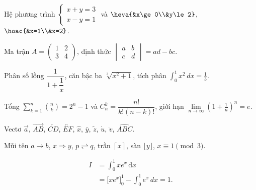 \documentclass[12pt]{article}
\begin{document}
Hệ phương trình $\begin{cases} x+y=3 \\ x-y=1 \end{cases}$ và $\heva{&x\ge 0\\&y\le 2}$, $\hoac{&x=1\\&x=2}$.

Ma trận $A=\begin{pmatrix} 1 & 2 \\ 3 & 4 \end{pmatrix}$, định thức $\begin{vmatrix} a & b \\ c & d \end{vmatrix}=ad-bc$.

Phân số lồng $\dfrac{1}{1+\dfrac{1}{x}}$, căn bậc ba $\sqrt[3]{x^2+1}$, tích phân $\displaystyle\int_0^1 x^2\,dx=\frac{1}{3}$.

Tổng $\sum\limits_{k=1}^{n} \binom{n}{k} = 2^n - 1$ và $C_n^k = \dfrac{n!}{k!(n-k)!}$, giới hạn $\lim\limits_{n\to\infty}\left(1+\frac{1}{n}\right)^n = e$.

Vectơ $\vec{a}$, $\overrightarrow{AB}$, $\overleftarrow{CD}$, $\overleftrightarrow{EF}$, $\hat{x}$, $\bar{y}$, $\tilde{z}$, $\dot{u}$, $\ddot{v}$, $\widehat{ABC}$.

Mũi tên $a \rightarrow b$, $x \Rightarrow y$, $p \rightleftharpoons q$, trần $\left\lceil x \right\rceil$, sàn $\lfloor y \rfloor$, $x \equiv 1 \pmod 3$.

\begin{align}
I &= \int_0^1 x e^{x}\,\mathrm{d}x \label{eq:I}\\
  &= \Big[x e^x\Big]_0^1 - \int_0^1 e^x\,dx = 1. \nonumber
\end{align}
\end{document}

